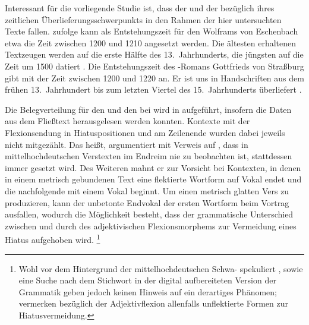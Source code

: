 Interessant für die vorliegende Studie ist, dass der  und der
 bezüglich ihres zeitlichen Überlieferungsschwerpunkts in den
Rahmen der hier untersuchten Texte fallen. \citet[1378]{bumke1999} zufolge kann
als Entstehungszeit für den  Wolframs von Eschenbach etwa die
Zeit zwischen 1200 und 1210 angesetzt werden. Die ältesten erhaltenen
Textzeugen werden auf die erste Hälfte des 13.~Jahrhunderts, die jüngsten auf
die Zeit um 1500 datiert
\autocites[1381]{bumke1999}[vgl.~auch][s.\,v.~\textit{Wolfram von Eschenbach:
}]{hsc}. Die Entstehungszeit des -Romans Gottfrieds
von Straßburg gibt \citet[155]{kuhn1982} mit der
Zeit zwischen 1200 und 1220 an. Er ist uns in Handschriften aus dem frühen
13.~Jahrhundert bis zum letzten Viertel des 15.~Jahrhunderts überliefert
\autocite[vgl.][s.\,v.~\textit{Gottfried von Straßburg: }]{hsc}.

Die Belegverteilung für den  und den  bei
\citet{askedal1973} wird in  aufgeführt, insofern die
Daten aus dem Fließtext herausgelesen werden konnten. Kontexte mit der
Flexionsendung in Hiatuspositionen und am Zeilenende wurden dabei jeweils nicht
mitgezählt. Das heißt, \citet[89--91]{askedal1973} argumentiert mit Verweis auf
\citet[662--663]{grimm1870}, dass in mittelhochdeutschen
Verstexten im Endreim nie  zu beobachten ist, stattdessen immer
 gesetzt wird. Des Weiteren mahnt er zur Vorsicht bei Kontexten, in
denen in einem metrisch gebundenen Text eine flektierte Wortform auf Vokal
endet und die nachfolgende mit einem Vokal beginnt. Um einen metrisch glatten
Vers zu produzieren, kann der unbetonte Endvokal der ersten Wortform beim
Vortrag ausfallen, wodurch die Möglichkeit besteht, dass der grammatische
Unterschied zwischen  und  durch  des
adjektivischen Flexionsmorphems zur Vermeidung eines Hiatus
aufgehoben wird.%
%
	\footnote{Wohl vor dem Hintergrund der
		mittelhochdeutschen Schwa-
		\autocites{lindgren1953}[109--111]{paul2007} spekuliert
		\citet[91]{askedal1973},  \citet[27, 109--111,
		203]{paul2007} sowie eine Suche nach dem Stichwort  in der
		digital aufbereiteten Version der Grammatik geben jedoch keinen Hinweis
		auf ein derartiges Phänomen; \citet[244]{ksw2} vermerken bezüglich der
		Adjektivflexion allenfalls unflektierte Formen
		zur Hiatusvermeidung.}
		
